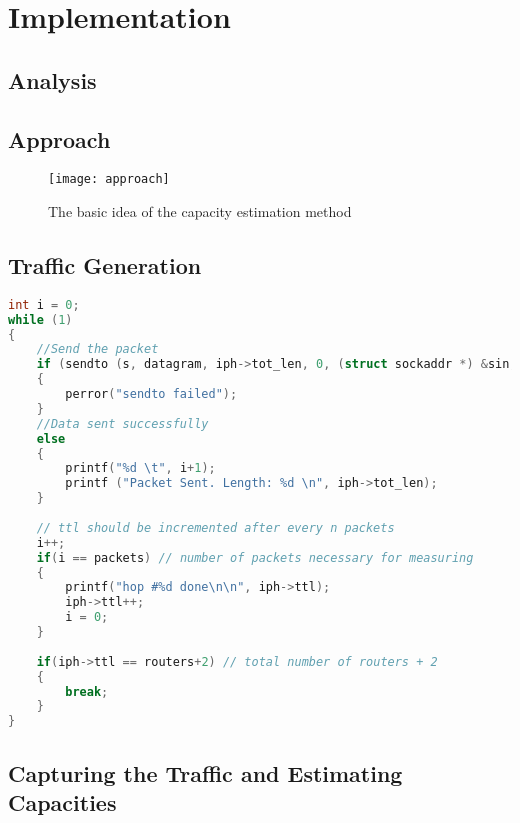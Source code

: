 \chapter{Implementation}

\section{Analysis}

\section{Approach}

\begin{figure}[h]
 \centering
 \texttt{[image: approach]}
 \caption{The basic idea of the capacity estimation method}
 \label{approach}
\end{figure}



\section{Traffic Generation}

\begin{lstlisting}[language=C]
int i = 0;
while (1)
{
    //Send the packet
    if (sendto (s, datagram, iph->tot_len, 0, (struct sockaddr *) &sin, sizeof(sin)) < 0)
    {
        perror("sendto failed");
    }
    //Data sent successfully
    else
    {
        printf("%d \t", i+1);
        printf ("Packet Sent. Length: %d \n", iph->tot_len);
    }
    
    // ttl should be incremented after every n packets
    i++;
    if(i == packets) // number of packets necessary for measuring
    {
        printf("hop #%d done\n\n", iph->ttl);
        iph->ttl++;
        i = 0;
    }
    
    if(iph->ttl == routers+2) // total number of routers + 2
    {
        break;
    }
}
\end{lstlisting}


\section{Capturing the Traffic and Estimating Capacities}

